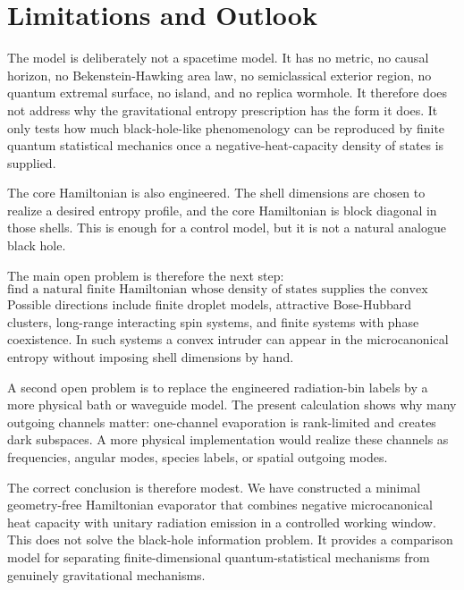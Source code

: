 \section{Limitations and Outlook}

The model is deliberately not a spacetime model. It has no metric, no causal horizon, no Bekenstein-Hawking area law, no semiclassical exterior region, no quantum extremal surface, no island, and no replica wormhole. It therefore does not address why the gravitational entropy prescription has the form it does. It only tests how much black-hole-like phenomenology can be reproduced by finite quantum statistical mechanics once a negative-heat-capacity density of states is supplied.

The core Hamiltonian is also engineered. The shell dimensions are chosen to realize a desired entropy profile, and the core Hamiltonian is block diagonal in those shells. This is enough for a control model, but it is not a natural analogue black hole.

The main open problem is therefore the next step:
\begin{equation}
  \text{find a natural finite Hamiltonian whose density of states supplies the convex window.}
\end{equation}
Possible directions include finite droplet models, attractive Bose-Hubbard clusters, long-range interacting spin systems, and finite systems with phase coexistence. In such systems a convex intruder can appear in the microcanonical entropy without imposing shell dimensions by hand.

A second open problem is to replace the engineered radiation-bin labels by a more physical bath or waveguide model. The present calculation shows why many outgoing channels matter: one-channel evaporation is rank-limited and creates dark subspaces. A more physical implementation would realize these channels as frequencies, angular modes, species labels, or spatial outgoing modes.

The correct conclusion is therefore modest. We have constructed a minimal geometry-free Hamiltonian evaporator that combines negative microcanonical heat capacity with unitary radiation emission in a controlled working window. This does not solve the black-hole information problem. It provides a comparison model for separating finite-dimensional quantum-statistical mechanisms from genuinely gravitational mechanisms.
